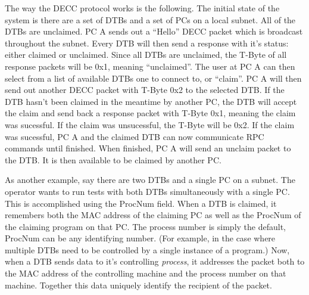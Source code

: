 \documentclass{article}
\begin{document}
The way the DECC protocol works is the following. The initial state of the system is there are a set of DTBs and a set of PCs on a local subnet. All of the DTBs are unclaimed. PC A sends out a ``Hello'' DECC packet which is broadcast throughout the subnet. Every DTB will then send a response with it's status: either claimed or unclaimed. Since all DTBs are unclaimed, the T-Byte of all response packets will be 0x1, meaning ``unclaimed''. The user at PC A can then select from a list of available DTBs one to connect to, or ``claim''. PC A will then send out another DECC packet with T-Byte 0x2 to the selected DTB. If the DTB hasn't been claimed in the meantime by another PC, the DTB will accept the claim and send back a response packet with T-Byte 0x1, meaning the claim was sucessful. If the claim was unsucessful, the T-Byte will be 0x2. If the claim was sucessful, PC A and the claimed DTB can now communicate RPC commands until finished. When finished, PC A will send an unclaim packet to the DTB. It is then available to be claimed by another PC. 

As another example, say there are two DTBs and a single PC on a subnet. The operator wants to run tests with both DTBs simultaneously with a single PC. This is accomplished using the ProcNum field. When a DTB is claimed, it remembers both the MAC address of the claiming PC as well as the ProcNum of the claiming program on that PC. The process number is simply the default, ProcNum can be any identifying number. (For example, in the case where multiple DTBs need to be controlled by a single instance of a program.) Now, when a DTB sends data to it's controlling \textit{process}, it addresses the packet both to the MAC address of the controlling machine and the process number on that machine.  Together this data uniquely identify the recipient of the packet.
\end{document}
